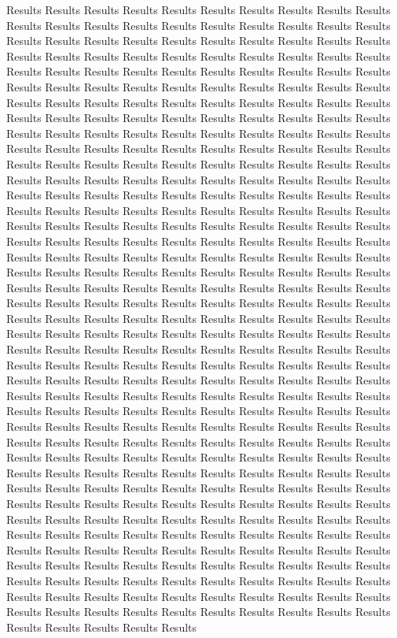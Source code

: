 \documentclass[
]{article}
\begin{document}
Results Results Results Results Results Results Results Results Results Results Results Results Results Results Results Results Results Results Results Results Results Results Results Results Results Results Results Results Results Results Results Results Results Results Results Results Results Results Results Results Results Results Results Results Results Results Results Results Results Results Results Results Results Results Results Results Results Results Results Results Results Results Results Results Results Results Results Results Results Results Results Results Results Results Results Results Results Results Results Results Results Results Results Results Results Results Results Results Results Results Results Results Results Results Results Results Results Results Results Results Results Results Results Results Results Results Results Results Results Results Results Results Results Results Results Results Results Results Results Results Results Results Results Results Results Results Results Results Results Results Results Results Results Results Results Results Results Results Results Results Results Results Results Results Results Results Results Results Results Results Results Results Results Results Results Results Results Results Results Results Results Results Results Results Results Results Results Results Results Results Results Results Results Results Results Results Results Results Results Results Results Results Results Results Results Results Results Results Results Results Results Results Results Results Results Results Results Results Results Results Results Results Results Results Results Results Results Results Results Results Results Results Results Results Results Results Results Results Results Results Results Results Results Results Results Results Results Results Results Results Results Results Results Results Results Results Results Results Results Results Results Results Results Results Results Results Results Results Results Results Results Results Results Results Results Results Results Results Results Results Results Results Results Results Results Results Results Results Results Results Results Results Results Results Results Results Results Results Results Results Results Results Results Results Results Results Results Results Results Results Results Results Results Results Results Results Results Results Results Results Results Results Results Results Results Results Results Results Results Results Results Results Results Results Results Results Results Results Results Results Results Results Results Results Results Results Results Results Results Results Results Results Results Results Results Results Results Results Results Results Results Results Results Results Results Results Results Results Results Results Results Results Results Results Results Results Results Results Results Results Results Results Results Results Results Results Results Results Results Results Results Results Results Results Results Results Results Results Results Results Results Results Results Results Results Results Results Results Results Results Results Results Results Results Results Results Results Results Results Results Results Results Results Results Results
\end{document}
